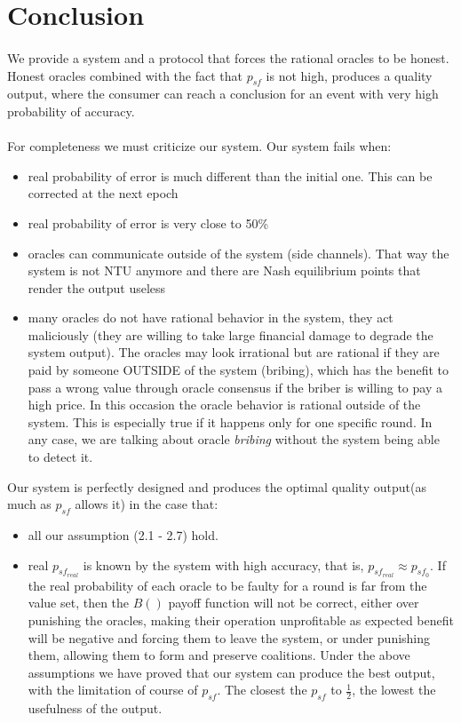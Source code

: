 \documentclass{article}
\begin{document}
\section{Conclusion}
\paragraph{ }
We provide a system and a protocol that forces the rational oracles to be honest. Honest oracles combined with the fact that ${p_{sf}}$ is not high, produces a quality output, where the consumer can reach a conclusion for an event with very high probability of accuracy.
\paragraph{ }
For completeness we must criticize our system. Our system fails when:\\
\begin{itemize}
\item real probability of error is much different than the initial one. This can be corrected at the next epoch
\item real probability of error is very close to 50\%
\item oracles can communicate outside of the system (side channels). That way the system is not NTU anymore and there are  Nash equilibrium points that render the output useless
\item many oracles do not have rational behavior in the system, they act maliciously (they are willing to take large financial damage to degrade the system output). The oracles may look irrational but are rational if they are paid by someone OUTSIDE of the system (bribing), which has the benefit to pass a wrong value through oracle consensus if the briber is willing to pay a high price. In this occasion the oracle behavior is rational outside of the system. This is especially true if it happens only for one specific round. In any case, we are talking about oracle \emph{bribing} without the system being able to detect it.
\end{itemize}

Our system is perfectly designed and produces the optimal quality output(as much as $p_{sf}$ allows it) in the case that:
\begin{itemize}
\item all our assumption (2.1 - 2.7) hold.
\item real $p_{sf_{real}}$ is known by the system with high accuracy, that is, $p_{sf_{real}}\approx p_{sf_{0}}$. If the real probability of each oracle to be faulty for a round is far from the value set, then the $B()$ payoff function will not be correct, either over punishing the oracles, making their operation unprofitable as expected benefit will be negative and forcing them to leave the system, or under punishing them, allowing them to form and preserve coalitions.
Under the above assumptions we have proved that our system can produce the best output, with the limitation of course of $p_{sf}$. The closest the $p_{sf}$ to $\frac{1}{2}$, the lowest the usefulness of the output.
\end{itemize}
\end{document}
